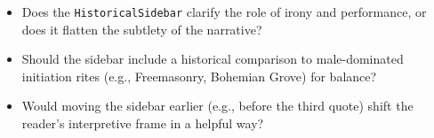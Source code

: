 \begin{itemize}
  \item Does the \texttt{HistoricalSidebar} clarify the role of irony and performance, or does it flatten the subtlety of the narrative?
  \item Should the sidebar include a historical comparison to male-dominated initiation rites (e.g., Freemasonry, Bohemian Grove) for balance?
  \item Would moving the sidebar earlier (e.g., before the third quote) shift the reader’s interpretive frame in a helpful way?
\end{itemize}

